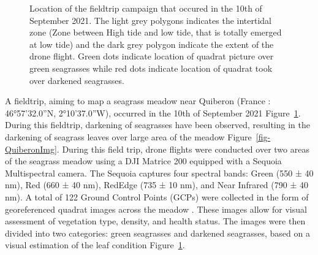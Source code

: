 \documentclass[
  number]{elsarticle}
\begin{document}
\label{cell-fig-quiberonMap}
\begin{figure}[H]


\caption{\label{fig-quiberonMap}Location of the fieldtrip campaign that
occured in the 10th of September 2021. The light grey polygons indicates
the intertidal zone (Zone between High tide and low tide, that is
totally emerged at low tide) and the dark grey polygon indicate the
extent of the drone flight. Green dots indicate location of quadrat
picture over green seagrasses while red dots indicate location of
quadrat took over darkened seagrasses.}

\end{figure}%

A fieldtrip, aiming to map a seagrass meadow near Quiberon (France :
46°57'32.0''N, 2°10'37.0''W), occurred in the 10th of September 2021
Figure~\ref{fig-quiberonMap}. During this fieldtrip, darkening of
seagrasses have been observed, resulting in the darkening of seagrass
leaves over large area of the meadow Figure~\ref{fig-QuiberonImg}.
During this field trip, drone flights were conducted over two areas of
the seagrass meadow using a DJI Matrice 200 equipped with a Sequoia
Multispectral camera. The Sequoia captures four spectral bands: Green
(550 ± 40 nm), Red (660 ± 40 nm), RedEdge (735 ± 10 nm), and Near
Infrared (790 ± 40 nm). A total of 122 Ground Control Points (GCPs) were
collected in the form of georeferenced quadrat images across the meadow
. These images allow for visual assessment of vegetation type, density,
and health status. The images were then divided into two categories:
green seagrasses and darkened seagrasses, based on a visual estimation
of the leaf condition Figure~\ref{fig-quiberonMap}.
\end{document}
